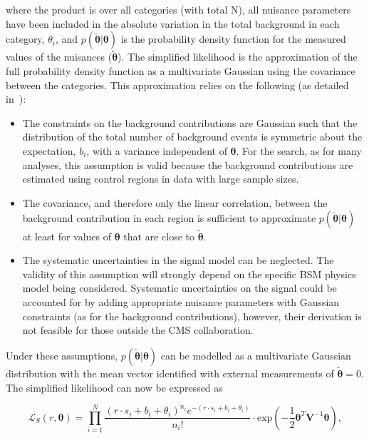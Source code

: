 where the product is over all categories (with total N), all nuisance parameters
have been included in the absolute variation in the total background in each category, $\theta_i$, and
$p(\tilde{\boldsymbol{\theta}}|\boldsymbol{\theta})$ is the probability density function for the measured 
values of the nuisances ($\tilde{\boldsymbol{\theta}}$). 
The simplified likelihood is the approximation of the full probability density function 
as a multivariate Gaussian using the covariance between the categories.
This approximation relies on the following (as detailed in~\cite{simp-lik}):
\begin{itemize}
\item{The constraints on the background contributions are Gaussian such that the distribution of 
the total number of background events is symmetric about the expectation, $b_{i}$, 
with a variance independent of $\boldsymbol{\theta}$. For the \alphat search, as for many analyses, 
this assumption is valid because the background contributions are estimated using control regions in 
data with large sample sizes.}

\item{The covariance, and therefore only the linear correlation, 
between the background contribution in each region is sufficient 
to approximate $p(\tilde{\boldsymbol{\theta}}|\boldsymbol{\theta})$ 
at least for values of $\boldsymbol{\theta}$ that are close to $\tilde{\boldsymbol{\theta}}$.}

\item{The systematic uncertainties in the signal model can be neglected. The validity of 
this assumption will strongly depend on the specific BSM physics model being considered. 
Systematic uncertainties on the signal could be accounted for by adding appropriate 
nuisance parameters with Gaussian constraints (as for the background contributions), however,
their derivation is not feasible for those outside the CMS collaboration.} 
\end{itemize}

Under these assumptions, $p(\tilde{\boldsymbol{\theta}}|\boldsymbol{\theta})$ can be modelled as a multivariate 
Gaussian distribution with the mean vector identified with external measurements of 
$\tilde{\boldsymbol{\theta}}=0$. The simplified likelihood can now be expressed as

\begin{equation}
\mathcal{L}_{S}(r, \boldsymbol{\theta}) =  \prod_{i=1}^{N} \dfrac{(r \cdot s_{i}+b_{i}+\theta_{i})^{n_{i}} e^{-(r \cdot s_{i}+b_{i}+\theta_{i})} }{n_{i}!} \cdot  
\mathrm{exp}\left(-\dfrac{1}{2} \boldsymbol{\theta}^{T}\mathrm{\mathbf{V}}^{-1}\boldsymbol{\theta} \right),
\label{eq:full-likelihood}
\end{equation}

